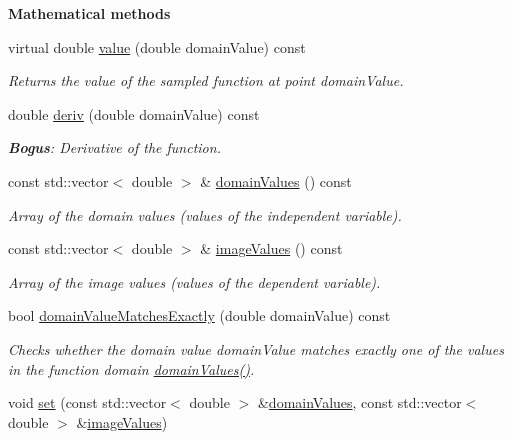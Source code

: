\begin{Indent}{\bf Mathematical methods}\par
\begin{DoxyCompactItemize}
\item 
virtual double \hyperlink{class_q_u_e_s_o_1_1_sampled1_d1_d_function_a779a96683625c9bf6a161cf98ab63f9b}{value} (double domain\-Value) const 
\begin{DoxyCompactList}\small\item\em Returns the value of the sampled function at point {\ttfamily domain\-Value}. \end{DoxyCompactList}\item 
double \hyperlink{class_q_u_e_s_o_1_1_sampled1_d1_d_function_a5579fd73a76c5f82b6f55472c8123bb7}{deriv} (double domain\-Value) const 
\begin{DoxyCompactList}\small\item\em {\bfseries Bogus}\-: Derivative of the function. \end{DoxyCompactList}\item 
const std\-::vector$<$ double $>$ \& \hyperlink{class_q_u_e_s_o_1_1_sampled1_d1_d_function_ae3ece65039bde30a1392c479ad9b9a1c}{domain\-Values} () const 
\begin{DoxyCompactList}\small\item\em Array of the domain values (values of the independent variable). \end{DoxyCompactList}\item 
const std\-::vector$<$ double $>$ \& \hyperlink{class_q_u_e_s_o_1_1_sampled1_d1_d_function_a2354fe46fe075637a85998e1a4f2d64d}{image\-Values} () const 
\begin{DoxyCompactList}\small\item\em Array of the image values (values of the dependent variable). \end{DoxyCompactList}\item 
bool \hyperlink{class_q_u_e_s_o_1_1_sampled1_d1_d_function_aba6caa896d9a2c20e354d899bda195d3}{domain\-Value\-Matches\-Exactly} (double domain\-Value) const 
\begin{DoxyCompactList}\small\item\em Checks whether the domain value {\ttfamily domain\-Value} matches exactly one of the values in the function domain {\ttfamily \hyperlink{class_q_u_e_s_o_1_1_sampled1_d1_d_function_ae3ece65039bde30a1392c479ad9b9a1c}{domain\-Values()}}. \end{DoxyCompactList}\item 
void \hyperlink{class_q_u_e_s_o_1_1_sampled1_d1_d_function_a7bac8d9e058363240db15bd488e74772}{set} (const std\-::vector$<$ double $>$ \&\hyperlink{class_q_u_e_s_o_1_1_sampled1_d1_d_function_ae3ece65039bde30a1392c479ad9b9a1c}{domain\-Values}, const std\-::vector$<$ double $>$ \&\hyperlink{class_q_u_e_s_o_1_1_sampled1_d1_d_function_a2354fe46fe075637a85998e1a4f2d64d}{image\-Values})

\end{DoxyCompactItemize}
\end{Indent}
